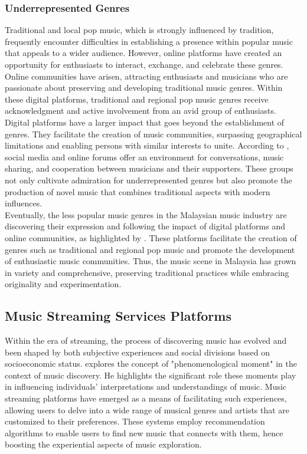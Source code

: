 \subsubsection{Underrepresented Genres}
Traditional and local pop music, which is strongly influenced by tradition, frequently encounter difficulties in establishing a presence within popular music that appeals to a wider audience. However, online platforms have created an opportunity for enthusiasts to interact, exchange, and celebrate these genres. Online communities have arisen, attracting enthusiasts and musicians who are passionate about preserving and developing traditional music genres. Within these digital platforms, traditional and regional pop music genres receive acknowledgment and active involvement from an avid group of enthusiasts. \\

Digital platforms have a larger impact that goes beyond the establishment of genres. They facilitate the creation of music communities, surpassing geographical limitations and enabling persons with similar interests to unite. According to \textcite{silahudin19}, social media and online forums offer an environment for conversations, music sharing, and cooperation between musicians and their supporters. These groups not only cultivate admiration for underrepresented genres but also promote the production of novel music that combines traditional aspects with modern influences. \\

Eventually, the less popular music genres in the Malaysian music industry are discovering their expression and following the impact of digital platforms and online communities, as highlighted by \textcite{silahudin19}. These platforms facilitate the creation of genres such as traditional and regional pop music and promote the development of enthusiastic music communities. Thus, the music scene in Malaysia has grown in variety and comprehensive, preserving traditional practices while embracing originality and experimentation. \pagebreak

\subsection{Music Streaming Services Platforms}
Within the era of streaming, the process of discovering music has evolved and been shaped by both subjective experiences and social divisions based on socioeconomic status. \textcite{ellis20} explores the concept of "phenomenological moment" in the context of music discovery. He highlights the significant role these moments play in influencing individuals' interpretations and understandings of music. Music streaming platforms have emerged as a means of facilitating such experiences, allowing users to delve into a wide range of musical genres and artists that are customized to their preferences. These systems employ recommendation algorithms to enable users to find new music that connects with them, hence boosting the experiential aspects of music exploration. \\

